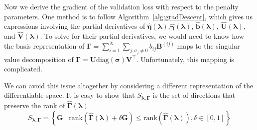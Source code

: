 \documentclass[12pt,letterpaper]{article}
\begin{document}
Now we derive the gradient of the validation loss with respect to the penalty parameters. One method is to follow Algorithm~\ref{alg:gradDescent}, which gives us expressions involving the partial derivatives of $ \hat{\boldsymbol{\eta}}(\boldsymbol{\lambda})$,$ \hat{\boldsymbol{\gamma}}(\boldsymbol{\lambda})$, $ \hat{\boldsymbol{b}}(\boldsymbol{\lambda})$, $\hat{\boldsymbol{U}}(\boldsymbol{\lambda})$, and $ \hat{\boldsymbol{V}}(\boldsymbol{\lambda})$. To solve for their partial derivatives, we would need to know how the basis representation of $\boldsymbol{\Gamma} =  \sum_{i=1}^N \sum_{j:\sigma_j \ne 0} b_{ij} \boldsymbol{B}^{(ij)}$ maps to the singular value decomposition of $\boldsymbol{\Gamma}= {\boldsymbol{U}} \text{diag}({\boldsymbol{\sigma}}) \boldsymbol{V}^\top$. Unfortunately, this mapping is complicated.

We can avoid this issue altogether by considering a different representation of the differentiable space. It is easy to show that $S_{\boldsymbol{\lambda}, \boldsymbol{\Gamma}}$ is the set of directions that preserve the rank of $\hat{\boldsymbol{\Gamma}}(\boldsymbol{\lambda})$
\begin{equation}
S_{\boldsymbol{\lambda}, \boldsymbol{\Gamma}} = \left \{
\boldsymbol{G} 
\middle | 
\text{rank} \left (
\hat{\boldsymbol{\Gamma}}(\boldsymbol{\lambda}) + \delta \boldsymbol{G}
\right ) 
\le 
\text{rank} \left (
\hat{\boldsymbol{\Gamma}}(\boldsymbol{\lambda})
\right ), 
\delta \in [0,1] 
\right \}
\label{eq:rank_preserve_diff_space}
\end{equation}

\end{document}
